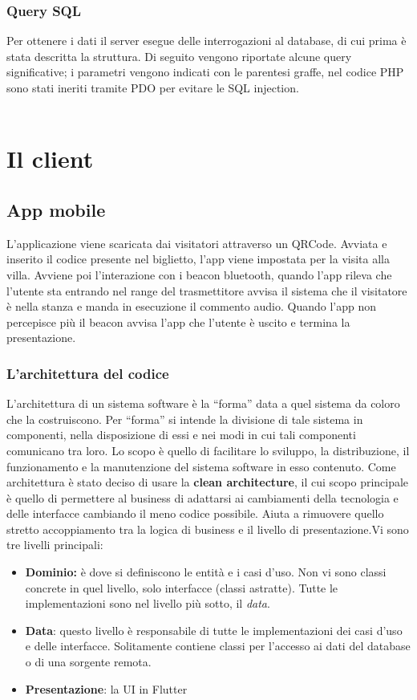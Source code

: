 \documentclass[12pt]{article}
\begin{document}
\subsubsection{Query SQL}
Per ottenere i dati il server esegue delle interrogazioni al database, di cui prima è stata descritta la struttura. Di seguito vengono riportate alcune query significative; i parametri vengono indicati con le parentesi graffe, nel codice PHP sono stati ineriti tramite PDO per evitare le SQL injection.\\\\

\section{Il client}
\subsection{App mobile}
L'applicazione viene scaricata dai visitatori attraverso un QRCode. Avviata
e inserito il codice presente nel biglietto, l’app viene impostata per la visita alla villa. Avviene poi l'interazione con i beacon bluetooth, quando l’app rileva che l'utente sta entrando nel range del trasmettitore avvisa il sistema che il visitatore è nella stanza e manda in esecuzione il commento audio. Quando l’app non percepisce più il beacon avvisa l’app che l’utente è uscito e termina la presentazione.

\subsubsection{L'architettura del codice}
L’architettura di un sistema software è la “forma” data a quel sistema da coloro che la costruiscono. Per  “forma” si intende la divisione di tale sistema in componenti, nella disposizione di essi e nei modi in cui tali componenti comunicano tra loro. Lo scopo è  quello di facilitare lo sviluppo, la distribuzione, il funzionamento e la manutenzione del sistema software in esso contenuto.\cite{architettura_codice}
Come architettura è stato deciso di usare la \textbf{clean architecture}, il cui scopo principale è quello di permettere al business di adattarsi ai cambiamenti della tecnologia e delle interfacce cambiando il meno codice possibile. Aiuta a rimuovere quello stretto accoppiamento tra la logica di business e il livello di presentazione.\cite{architettura_introduction}\clearpage Vi sono tre livelli principali:
\begin{itemize}
    \item \textbf{Dominio:} è dove si definiscono le entità e i casi d'uso. Non vi sono classi concrete in quel livello, solo interfacce (classi astratte). Tutte le implementazioni sono nel livello più sotto, il \emph{data}. 
    \item \textbf{Data}: questo livello è responsabile di tutte le implementazioni dei casi d'uso e delle interfacce. Solitamente contiene classi per l'accesso ai dati del database o di una sorgente remota.
    \item \textbf{Presentazione}: la UI in Flutter
\end{itemize}
\end{document}
